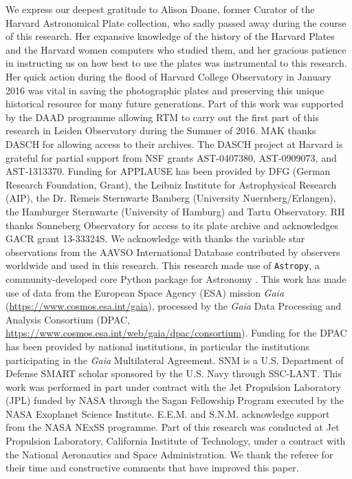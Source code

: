 \documentclass[twocolumn]{aa}
\begin{document}
\begin{acknowledgements}
We express our deepest gratitude to Alison Doane, former Curator of the Harvard Astronomical Plate collection, who sadly passed away during the course of this research.
%
Her expansive knowledge of the history of the Harvard Plates and the Harvard women computers who studied them, and her gracious patience in instructing us on how best to use the plates was instrumental to this research.
%
Her quick action during the flood of Harvard College Observatory in January 2016 was vital in saving the photographic plates and preserving this unique historical resource for many future generations.
%
Part of this work was supported by the DAAD programme allowing RTM to carry out the first part of this research in Leiden Observatory during the Summer of 2016.
      MAK thanks DASCH for allowing access to their archives.
      The DASCH project at Harvard is grateful for partial support from NSF grants AST-0407380, AST-0909073, and AST-1313370.
      Funding for APPLAUSE has been provided by DFG (German Research Foundation, Grant), the Leibniz Institute for Astrophysical Research (AIP), the Dr. Remeis Sternwarte Bamberg (University Nuernberg/Erlangen), the Hamburger Sternwarte (University of Hamburg) and Tartu Observatory.
      RH thanks Sonneberg Observatory for access to its plate archive and acknowledges GACR grant 13-33324S.
      We acknowledge with thanks the variable star observations from the AAVSO International Database contributed by observers worldwide and used in this research.
This research made use of {\tt Astropy}, a community-developed core Python
package for Astronomy \citep{2013A&A...558A..33A}.
This work has made use of data from the European Space Agency (ESA) mission
{\it Gaia} (\url{https://www.cosmos.esa.int/gaia}), processed by the {\it Gaia}
Data Processing and Analysis Consortium (DPAC,
\url{https://www.cosmos.esa.int/web/gaia/dpac/consortium}). Funding for the DPAC
has been provided by national institutions, in particular the institutions
participating in the {\it Gaia} Multilateral Agreement.
SNM is a U.S. Department of Defense SMART scholar sponsored by the U.S. Navy through SSC-LANT.
This work was performed in part under contract with the Jet Propulsion Laboratory (JPL) funded by NASA through the Sagan Fellowship Program executed by the NASA Exoplanet Science Institute.
E.E.M. and S.N.M. acknowledge support from the NASA NExSS programme. 
Part of this research was conducted at Jet Propulsion Laboratory, California Institute of Technology, under a contract with the National Aeronautics and Space Administration.
    We thank the referee for their time and constructive comments that have improved this paper.

\end{acknowledgements}



\end{document}
